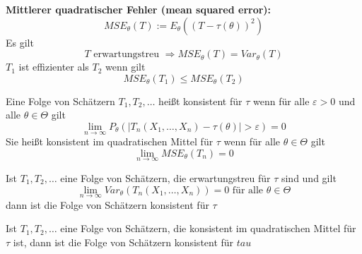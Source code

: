 \documentclass[
	ngerman,
	accentcolor=9c,%
	type=intern,
	marginpar=false
	]{tudapub}
\begin{document}
            \textbf{Mittlerer quadratischer Fehler (mean squared error):}
            \begin{equation*}
                MSE_{\theta}(T) := E_\theta((T-\tau(\theta))^2) 
            \end{equation*}
            Es gilt
            \begin{equation*}
                T \text{ erwartungstreu } \Rightarrow MSE_\theta(T) = Var_\theta(T)
            \end{equation*}
            $T_1$ ist effizienter als $T_2$ wenn gilt 
            \begin{equation*}
                MSE_{\theta}(T_1) \leq MSE_{\theta}(T_2) 
            \end{equation*}
            \begin{definition}
                Eine Folge von Schätzern $T_1,T_2,\dots$ heißt konsistent für $\tau$ wenn für alle $\varepsilon > 0$ und alle $\theta \in \Theta$ gilt 
                \begin{equation*}
                    \lim_{n \rightarrow \infty} P_\theta(|T_n(X_1,\dots,X_n)-\tau(\theta)|>\varepsilon) = 0
                \end{equation*}
                Sie heißt konsistent im quadratischen Mittel für $\tau$ wenn für alle $\theta \in \Theta$ gilt
                \begin{equation*}
                    \lim_{n\rightarrow\infty}MSE_\theta(T_n) = 0
                \end{equation*}
            \end{definition}
            \begin{satz}
                Ist $T_1,T_2,\dots$ eine Folge von Schätzern, die erwartungstreu für $\tau$ sind und gilt 
                \begin{equation*}
                    \lim_{n\rightarrow \infty} Var_\theta(T_n(X_1,\dots,X_n))= 0 \text{ für alle } \theta \in \Theta
                \end{equation*}
                dann ist die Folge von Schätzern konsistent für $\tau$
            \end{satz}
            \begin{satz}
                Ist $T_1,T_2,\dots$ eine Folge von Schätzern, die konsistent im quadratischen Mittel für $\tau$ ist,
                dann ist die Folge von Schätzern konsistent für $tau$
            \end{satz}
\end{document}
